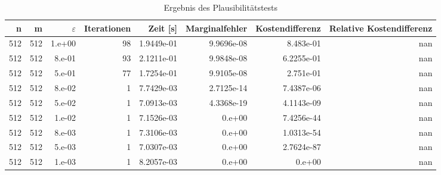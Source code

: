 \begin{table}[htbp]
\caption{Ergebnis des Plausibilitätstests}
\label{tab:Plausibilitaetstest512}
\small
\centering
{}
\begin{tabular}{rrrrrrrr}
\toprule
n & m & $\varepsilon$ & Iterationen & Zeit [s] & Marginalfehler & Kostendifferenz & Relative Kostendifferenz \\
\midrule
512 & 512 & 1.e+00 & 98 & 1.9449e-01 & 9.9696e-08 & 8.483e-01 & nan \\
512 & 512 & 8.e-01 & 93 & 2.1211e-01 & 9.9848e-08 & 6.2255e-01 & nan \\
512 & 512 & 5.e-01 & 77 & 1.7254e-01 & 9.9105e-08 & 2.751e-01 & nan \\
512 & 512 & 8.e-02 & 1 & 7.7429e-03 & 2.7125e-14 & 7.4387e-06 & nan \\
512 & 512 & 5.e-02 & 1 & 7.0913e-03 & 4.3368e-19 & 4.1143e-09 & nan \\
512 & 512 & 1.e-02 & 1 & 7.1526e-03 & 0.e+00 & 7.4256e-44 & nan \\
512 & 512 & 8.e-03 & 1 & 7.3106e-03 & 0.e+00 & 1.0313e-54 & nan \\
512 & 512 & 5.e-03 & 1 & 7.0307e-03 & 0.e+00 & 2.7624e-87 & nan \\
512 & 512 & 1.e-03 & 1 & 8.2057e-03 & 0.e+00 & 0.e+00 & nan \\
\bottomrule
\end{tabular}
\end{table}

